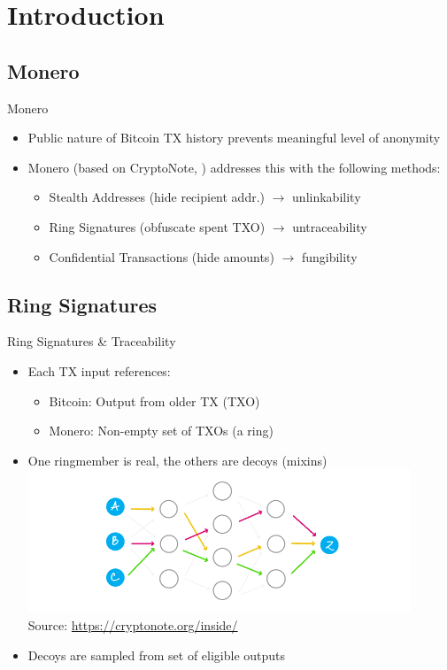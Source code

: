 
\section{Introduction}

\subsection{Monero}
\begin{frame}{Monero}\label{sec:monero}
	\begin{itemize}
		\item Public nature of Bitcoin TX history prevents meaningful level of anonymity
		\item Monero (based on CryptoNote, \cite{van_saberhagen_cryptonote_2013}) addresses this with the following methods:
		\begin{itemize}[<+-|alert@+>]
			\item Stealth Addresses (hide recipient addr.) $\to$ unlinkability
			\item \alert<4->{Ring Signatures (obfuscate spent TXO) $\to$ untraceability}
			\item Confidential Transactions (hide amounts) $\to$ fungibility
		\end{itemize} 
	\end{itemize}
\end{frame}

\subsection{Ring Signatures}
\begin{frame}{Ring Signatures \& Traceability}
	\vspace*{-10pt}
	\begin{itemize}[<+->]
		\item Each TX input references:
		\begin{itemize}
			\item Bitcoin: Output from older TX (TXO)
			\item Monero: Non-empty set of TXOs (a ring)
		\end{itemize}
		\item One ringmember is real, the others are decoys (mixins)
		\includegraphics[width=0.9\textwidth]{./img/slides/cn-44.png}
{		\hspace*{90pt}\scriptsize Source: \url{https://cryptonote.org/inside/}}
		\item Decoys are sampled from set of eligible outputs
	\end{itemize}
\end{frame}

